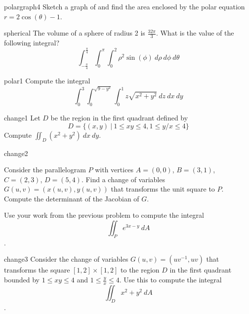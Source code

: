     \begin{problem}{polargraph4}
    Sketch a graph of and find the area enclosed by the polar equation $r = 2\cos(\theta) -1$.
    \end{problem}

    \begin{problem}{spherical}
        The volume of a sphere of radius 2 is $\frac{32\pi}{3}$.  What is the value of the following integral?$$\int_{-\frac{\pi}{4}}^{\frac{\pi}{4}}\int_0^\pi\int_0^2 \rho^2 \sin(\phi) \ d\rho \ d\phi \ d\theta$$
    \end{problem}

    \begin{problem}{polar1}
    Compute the integral $$\int_0^3\int_0^{\sqrt{9-y^2}}\int_0^1 z\sqrt{x^2 + y^2} \ dz \ dx \ dy$$
\end{problem}

\begin{problem}{change1}
    Let $D$ be the region in the first quadrant defined by $$D = \{ (x,y) \ | \ 1 \leq xy \leq 4, 1 \leq y/x \leq 4 \}$$
    Compute $\iint_D (x^2 + y^2) \ dx \ dy$.
\end{problem}

\begin{problem}{change2}
    \begin{subproblems}
    \item Consider the parallelogram $P$ with vertices $A = (0,0)$, $B = (3,1)$, $C = (2,3)$, $D = (5,4)$.  Find a change of variables $G(u,v) = (x(u,v), y(u,v))$ that transforms the unit square to $P$.  Compute the determinant of the Jacobian of $G$.
    \item Use your work from the previous problem to compute the integral $$\iint_P e^{3x-y} \ dA$$.
    \end{subproblems}
    
\end{problem}

\begin{problem}{change3}
    Consider the change of variables $G(u,v) = (uv^{-1}, uv)$ that transforms the square $[1,2]\times[1,2]$ to the region $D$ in the first quadrant bounded by $1 \leq xy \leq 4$ and $1 \leq \frac{y}{x} \leq 4$. Use this to compute the integral $$\iint_D x^2+y^2 \ dA$$.
\end{problem}
